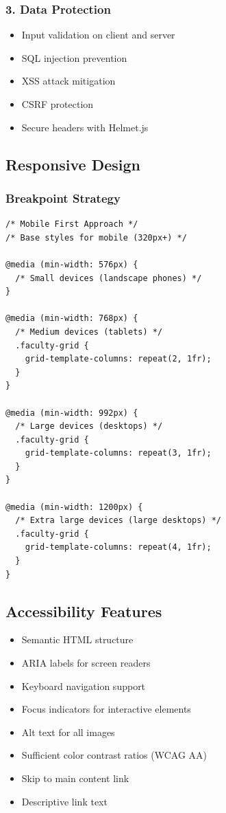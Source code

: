 \documentclass[12pt,a4paper]{report}
\begin{document}
\subsubsection*{3. Data Protection}
\begin{itemize}
    \item Input validation on client and server
    \item SQL injection prevention
    \item XSS attack mitigation
    \item CSRF protection
    \item Secure headers with Helmet.js
\end{itemize}

\subsection{Responsive Design}

\subsubsection*{Breakpoint Strategy}
\begin{lstlisting}[caption=Responsive CSS Breakpoints]
/* Mobile First Approach */
/* Base styles for mobile (320px+) */

@media (min-width: 576px) {
  /* Small devices (landscape phones) */
}

@media (min-width: 768px) {
  /* Medium devices (tablets) */
  .faculty-grid {
    grid-template-columns: repeat(2, 1fr);
  }
}

@media (min-width: 992px) {
  /* Large devices (desktops) */
  .faculty-grid {
    grid-template-columns: repeat(3, 1fr);
  }
}

@media (min-width: 1200px) {
  /* Extra large devices (large desktops) */
  .faculty-grid {
    grid-template-columns: repeat(4, 1fr);
  }
}
\end{lstlisting}

\subsection{Accessibility Features}

\begin{itemize}
    \item Semantic HTML structure
    \item ARIA labels for screen readers
    \item Keyboard navigation support
    \item Focus indicators for interactive elements
    \item Alt text for all images
    \item Sufficient color contrast ratios (WCAG AA)
    \item Skip to main content link
    \item Descriptive link text
\end{itemize}
\end{document}
